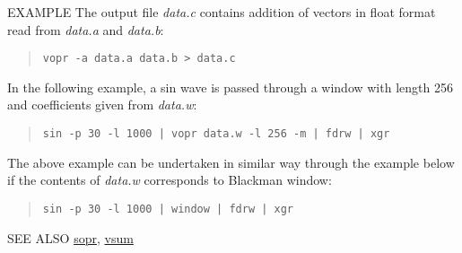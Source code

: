 \begin{options}
\end{options}

\begin{qsection}{EXAMPLE}
The output file {\em data.c} contains addition of
vectors in float format read from {\em data.a} and {\em data.b}:
\begin{quote}
  \verb!vopr -a data.a data.b > data.c !
\end{quote}
\par
In the following example, a sin wave is passed through
a window with length 256 and coefficients given from
{\em data.w}:
\begin{quote}
  \verb!sin -p 30 -l 1000 | vopr data.w -l 256 -m | fdrw | xgr!
\end{quote}
The above example can be undertaken in similar way
through the example below if the contents of {\em data.w} corresponds
to Blackman window:
\begin{quote}
  \verb!sin -p 30 -l 1000 | window | fdrw | xgr!
\end{quote}
\end{qsection}

\begin{qsection}{SEE ALSO}
\hyperlink{sopr}{sopr},
\hyperlink{vsum}{vsum}
\end{qsection}
